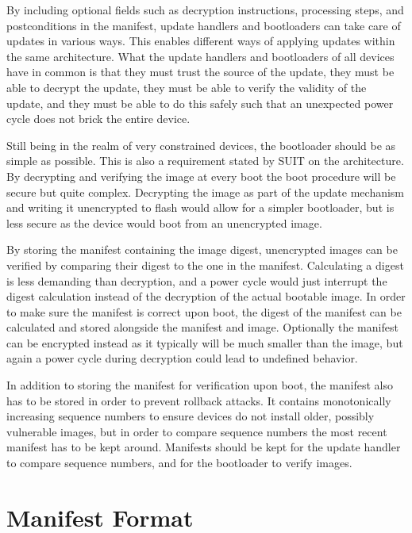 \documentclass[0-thesis.tex]{subfiles}
\begin{document}
By including optional fields such as decryption instructions, processing steps, and
postconditions in the manifest, update handlers and bootloaders can take care of updates
in various ways. This enables different ways of applying updates within the same
architecture. What the update handlers and bootloaders of all devices have in common is
that they must trust the source of the update, they must be able to decrypt the update,
they must be able to verify the validity of the update, and they must be able to do this
safely such that an unexpected power cycle does not brick the entire device.

Still being in the realm of very constrained devices, the bootloader should be as simple
as possible. This is also a requirement stated by SUIT on the architecture. By decrypting
and verifying the image at every boot the boot procedure will be secure but quite complex.
Decrypting the image as part of the update mechanism and writing it unencrypted to flash
would allow for a simpler bootloader, but is less secure as the device would boot from an
unencrypted image.

By storing the manifest containing the image digest, unencrypted images can be verified by
comparing their digest to the one in the manifest. Calculating a digest is less demanding
than decryption, and a power cycle would just interrupt the digest calculation instead of
the decryption of the actual bootable image. In order to make sure the manifest is correct
upon boot, the digest of the manifest can be calculated and stored alongside the manifest
and image. Optionally the manifest can be encrypted instead as it typically will be much
smaller than the image, but again a power cycle during decryption could lead to undefined
behavior.

In addition to storing the manifest for verification upon boot, the manifest also has to
be stored in order to prevent rollback attacks. It contains monotonically increasing
sequence numbers to ensure devices do not install older, possibly vulnerable images, but
in order to compare sequence numbers the most recent manifest has to be kept around.
Manifests should be kept for the update handler to compare sequence numbers, and for the
bootloader to verify images.

\section{Manifest Format}
\label{sec:manifest-format}
\end{document}
